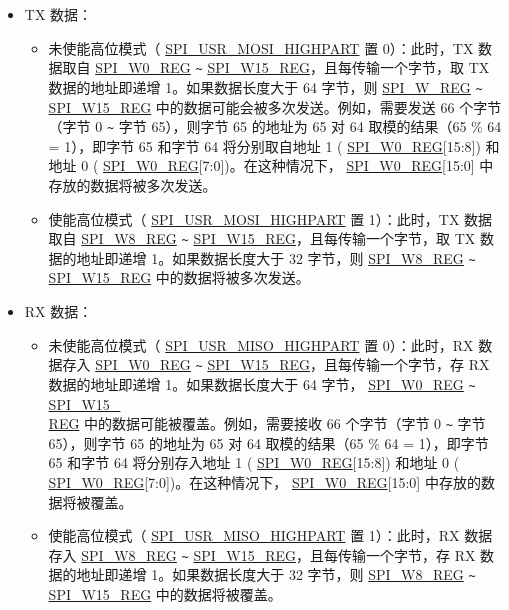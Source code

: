 \documentclass[main\_\_CN.tex]{subfiles}
\begin{document}
\begin{itemize}
    \item TX 数据：
    \begin{itemize}
        \item 未使能高位模式（ \hyperref[fielddesc:SPIUSRMOSIHIGHPART]{SPI\_USR\_MOSI\_HIGHPART} 置 0）：此时，TX 数据取自  \hyperref[regdesc:SPIW0REG]{SPI\_W0\_REG} \verb+~+  \hyperref[regdesc:SPIW15REG]{SPI\_W15\_REG}，且每传输一个字节，取 TX 数据的地址即递增 1。如果数据长度大于 64 字节，则  \hyperref[regdesc:SPIW0REG]{SPI\_W\_REG} \verb+~+ \hyperref[regdesc:SPIW15REG]{SPI\_W15\_REG} 中的数据可能会被多次发送。例如，需要发送 66 个字节（字节 0 \verb+~+ 字节 65），则字节 65 的地址为 65 对 64 取模的结果（65 \% 64 = 1），即字节 65 和字节 64 将分别取自地址 1 ( \hyperref[regdesc:SPIW0REG]{SPI\_W0\_REG}[15:8]) 和地址 0 ( \hyperref[regdesc:SPIW0REG]{SPI\_W0\_REG}[7:0])。在这种情况下， \hyperref[regdesc:SPIW0REG]{SPI\_W0\_REG}[15:0] 中存放的数据将被多次发送。
        \item 使能高位模式（ \hyperref[fielddesc:SPIUSRMOSIHIGHPART]{SPI\_USR\_MOSI\_HIGHPART} 置 1）：此时，TX 数据取自 \hyperref[regdesc:SPIW8REG]{SPI\_W8\_REG} \verb+~+  \hyperref[regdesc:SPIW15REG]{SPI\_W15\_REG}，且每传输一个字节，取 TX 数据的地址即递增 1。如果数据长度大于 32 字节，则  \hyperref[regdesc:SPIW8REG]{SPI\_W8\_REG} \verb+~+ \hyperref[regdesc:SPIW15REG]{SPI\_W15\_REG} 中的数据将被多次发送。
    \end{itemize}
    \item RX 数据：
    \begin{itemize}
        \item 未使能高位模式（ \hyperref[fielddesc:SPIUSRMISOHIGHPART]{SPI\_USR\_MISO\_HIGHPART} 置 0）：此时，RX 数据存入 \hyperref[regdesc:SPIW0REG]{SPI\_W0\_REG} \verb+~+ \hyperref[regdesc:SPIW15REG]{SPI\_W15\_REG}，且每传输一个字节，存 RX 数据的地址即递增 1。如果数据长度大于 64 字节， \hyperref[regdesc:SPIW0REG]{SPI\_W0\_REG} \verb+~+ \hyperref[regdesc:SPIW15REG]{SPI\_W15\_\\REG} 中的数据可能被覆盖。例如，需要接收 66 个字节（字节 0 \verb+~+ 字节 65），则字节 65 的地址为 65 对 64 取模的结果（65 \% 64 = 1），即字节 65 和字节 64 将分别存入地址 1 ( \hyperref[regdesc:SPIW0REG]{SPI\_W0\_REG}[15:8]) 和地址 0 ( \hyperref[regdesc:SPIW0REG]{SPI\_W0\_REG}[7:0])。在这种情况下， \hyperref[regdesc:SPIW0REG]{SPI\_W0\_REG}[15:0] 中存放的数据将被覆盖。
        \item 使能高位模式（ \hyperref[fielddesc:SPIUSRMISOHIGHPART]{SPI\_USR\_MISO\_HIGHPART} 置 1）：此时，RX 数据存入 \hyperref[regdesc:SPIW8REG]{SPI\_W8\_REG} \verb+~+ \hyperref[regdesc:SPIW15REG]{SPI\_W15\_REG}，且每传输一个字节，存 RX 数据的地址即递增 1。如果数据长度大于 32 字节，则  \hyperref[regdesc:SPIW8REG]{SPI\_W8\_REG} \verb+~+ \hyperref[regdesc:SPIW15REG]{SPI\_W15\_REG} 中的数据将被覆盖。
    \end{itemize}
\end{itemize}
\end{document}

